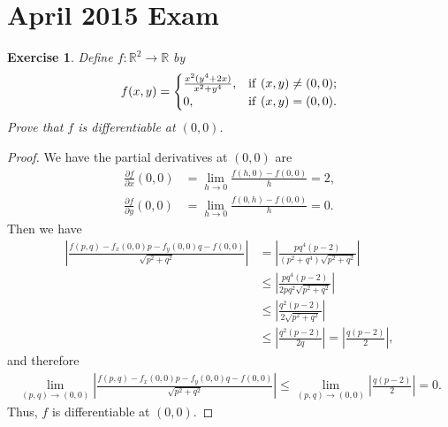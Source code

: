 \documentclass[11pt]{article}
\newtheorem{exercise}{Exercise}[section]
\theoremstyle{definition}
\numberwithin{equation}{subsection}
\begin{document}
\newpage
\section{April 2015 Exam}

\begin{exercise}
Define $f: \mathbb{R}^2 \to \mathbb{R}$ by
\begin{align*}
    f(x,y) = \begin{cases}
        \frac{x^2 (y^4 + 2x)}{x^2 + y^4}, & {\rm if}\,\, (x,y) \neq (0,0); \\
        0, & {\rm if}\,\, (x,y) = (0,0).
    \end{cases}
\end{align*}
Prove that $f$ is differentiable at $(0,0)$.
\end{exercise}
\begin{proof}
We have the partial derivatives at $(0,0)$ are
\begin{align*}
    \frac{\partial f}{\partial x}(0,0) & = \lim_{h\to 0} \frac{f(h,0) - f(0,0)}{h} = 2, \\
    \frac{\partial f}{\partial y}(0,0) & = \lim_{h\to 0} \frac{f(0,h) - f(0,0)}{h} = 0.
\end{align*}
Then we have
\begin{align*}
    \left| \frac{f(p,q) - f_x(0,0)p - f_y(0,0)q - f(0,0)}{\sqrt{p^2 + q^2}} \right| & = \left| \frac{pq^4 (p - 2)}{(p^2 + q^4) \sqrt{p^2 + q^2}} \right| \\
    & \leq \left| \frac{pq^4 (p - 2)}{ 2pq^2 \sqrt{p^2 + q^2}} \right| \\
    & \leq \left| \frac{q^2 (p - 2)}{ 2\sqrt{p^2 + q^2}} \right| \\
    & \leq \left| \frac{q^2 (p - 2)}{2q} \right| = \left| \frac{q(p - 2)}{2} \right|,
\end{align*}
and therefore
\begin{align*}
    \lim_{(p,q) \to (0,0)} \left| \frac{f(p,q) - f_x(0,0)p - f_y(0,0)q - f(0,0)}{\sqrt{p^2 + q^2}} \right| \leq \lim_{(p,q) \to (0,0)} \left| \frac{q(p - 2)}{2} \right| = 0.
\end{align*}
Thus, $f$ is differentiable at $(0,0)$.
\end{proof}

\medskip
\end{document}
